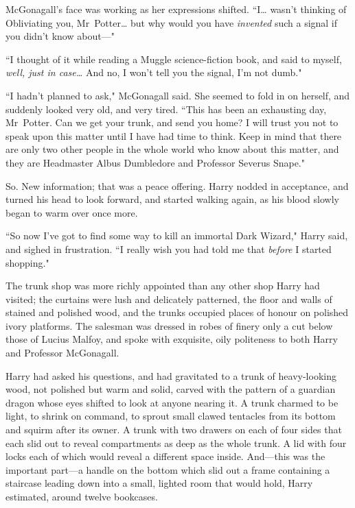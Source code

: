 McGonagall's face was working as her expressions shifted. ``I{\ldots} wasn't thinking of Obliviating you, Mr~Potter{\ldots} but why would you have \emph{invented} such a signal if you didn't know about—"

``I thought of it while reading a Muggle science-fiction book, and said to myself, \emph{well, just in case{\ldots}} And no, I won't tell you the signal, I'm not dumb."

``I hadn't planned to ask," McGonagall said. She seemed to fold in on herself, and suddenly looked very old, and very tired. ``This has been an exhausting day, Mr~Potter. Can we get your trunk, and send you home? I will trust you not to speak upon this matter until I have had time to think. Keep in mind that there are only two other people in the whole world who know about this matter, and they are Headmaster Albus Dumbledore and Professor Severus Snape."

So. New information; that was a peace offering. Harry nodded in acceptance, and turned his head to look forward, and started walking again, as his blood slowly began to warm over once more.

``So now I've got to find some way to kill an immortal Dark Wizard," Harry said, and sighed in frustration. ``I really wish you had told me that \emph{before} I started shopping."

\later

The trunk shop was more richly appointed than any other shop Harry had visited; the curtains were lush and delicately patterned, the floor and walls of stained and polished wood, and the trunks occupied places of honour on polished ivory platforms. The salesman was dressed in robes of finery only a cut below those of Lucius Malfoy, and spoke with exquisite, oily politeness to both Harry and Professor McGonagall.

Harry had asked his questions, and had gravitated to a trunk of heavy-looking wood, not polished but warm and solid, carved with the pattern of a guardian dragon whose eyes shifted to look at anyone nearing it. A trunk charmed to be light, to shrink on command, to sprout small clawed tentacles from its bottom and squirm after its owner. A trunk with two drawers on each of four sides that each slid out to reveal compartments as deep as the whole trunk. A lid with four locks each of which would reveal a different space inside. And—this was the important part—a handle on the bottom which slid out a frame containing a staircase leading down into a small, lighted room that would hold, Harry estimated, around twelve bookcases.

